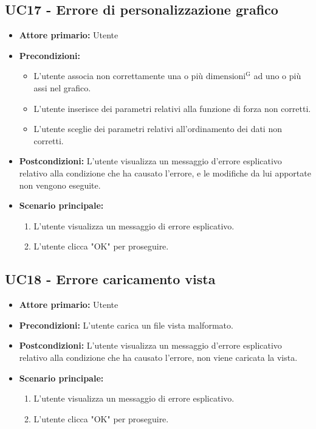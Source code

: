 \subsection{UC17 - Errore di personalizzazione grafico}
\label{sec:UC17 - Errore di personalizzazione}
\begin{itemize}
    \item \textbf{Attore primario:} Utente
    \item \textbf{Precondizioni:}
    		\begin{itemize}
    			\item L'utente associa non correttamente una o più ${\mathrm{dimensioni^{G}}}$ ad uno o più assi nel grafico.
    			\item L'utente inserisce dei parametri relativi alla funzione di forza non corretti.
    			\item L'utente sceglie dei parametri relativi all'ordinamento dei dati non corretti.
    		\end{itemize}
    \item \textbf{Postcondizioni:} L'utente visualizza un messaggio d'errore esplicativo relativo alla condizione che ha causato l'errore, e le modifiche da lui apportate non vengono eseguite.
    \item \textbf{Scenario principale:}
    \begin{enumerate}
        \item L'utente visualizza un messaggio di errore esplicativo.
        \item L'utente clicca "OK" per proseguire.
    \end{enumerate}
\end{itemize}

\subsection{UC18 - Errore caricamento vista}
\label{sec:UC18 - Errore caricamento vista}
\begin{itemize}
    \item \textbf{Attore primario:} Utente
    \item \textbf{Precondizioni:} L'utente carica un file vista malformato.
    \item \textbf{Postcondizioni:} L'utente visualizza un messaggio d'errore esplicativo relativo alla condizione che ha causato l'errore, non viene caricata la vista.
    \item \textbf{Scenario principale:}
    \begin{enumerate}
        \item L'utente visualizza un messaggio di errore esplicativo.
        \item L'utente clicca "OK" per proseguire.
    \end{enumerate}
\end{itemize}

